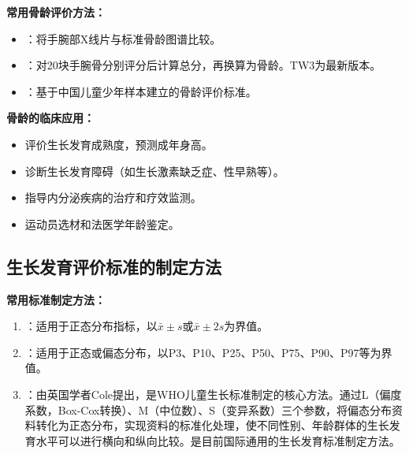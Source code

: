 \begin{keybox}
\textbf{常用骨龄评价方法：}

\begin{itemize}[leftmargin=*]
    \item {}：将手腕部X线片与标准骨龄图谱比较。
    \item {}：对20块手腕骨分别评分后计算总分，再换算为骨龄。TW3为最新版本。
    \item {}：基于中国儿童少年样本建立的骨龄评价标准。
\end{itemize}

\textbf{骨龄的临床应用：}
\begin{itemize}[leftmargin=*]
    \item 评价生长发育成熟度，预测成年身高。
    \item 诊断生长发育障碍（如生长激素缺乏症、性早熟等）。
    \item 指导内分泌疾病的治疗和疗效监测。
    \item 运动员选材和法医学年龄鉴定。
\end{itemize}
\end{keybox}

\subsection{生长发育评价标准的制定方法}

\begin{defbox}
\textbf{常用标准制定方法：}

\begin{enumerate}[leftmargin=*]
    \item {}：适用于正态分布指标，以$\bar{x}\pm s$或$\bar{x}\pm 2s$为界值。

    \item {}：适用于正态或偏态分布，以P3、P10、P25、P50、P75、P90、P97等为界值。

    \item {}：由英国学者Cole提出，是WHO儿童生长标准制定的核心方法。通过L（偏度系数，Box-Cox转换）、M（中位数）、S（变异系数）三个参数，将偏态分布资料转化为正态分布，实现资料的标准化处理，使不同性别、年龄群体的生长发育水平可以进行横向和纵向比较。是目前国际通用的生长发育标准制定方法。
\end{enumerate}
\end{defbox}

